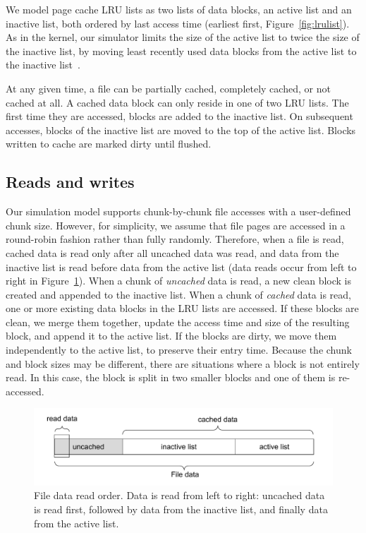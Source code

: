 We model page cache LRU lists as
two lists of data blocks, an active list and an inactive list, both ordered by
last access time (earliest first, Figure~\ref{fig:lrulist}).
As in the kernel, our simulator limits the size of the active list to
twice the size of the inactive list, by moving least recently
used data blocks from the active list to the inactive list~\cite{gorman2004understanding, linuxdev3rd2010}.

At any given time, a file can be partially cached, completely cached,
or not cached at all. A cached data block can only reside in one of two
LRU lists. The first time they are accessed, blocks are
added to the inactive list. On subsequent accesses, blocks of the
inactive list are moved to the top of the active list. Blocks
written to cache are marked dirty until flushed.

\subsection{Reads and writes}

Our simulation model supports chunk-by-chunk file accesses
with a user-defined chunk size. However, for simplicity, we assume that file pages are
accessed in a round-robin fashion rather than fully randomly.
Therefore, when a file is read, cached data is read only after all uncached data was read, and data from the inactive list is read
before data from the active list
(data reads occur from left to right in Figure~\ref{fig:read_order}).
When a chunk of \emph{uncached} data is read, a new clean block is created
and appended to the inactive list.
When a chunk of \emph{cached} data is read, one or more existing data blocks in the LRU lists are accessed.
If these blocks are clean, we merge them together, update the access time and size of the resulting block,
and append it to the active list.
If the blocks are dirty, we move them independently to the active list, to preserve their entry time.
Because the chunk and block sizes may be different, there are situations
where a block is not entirely read.
In this case, the block is split in two smaller blocks and one of them is re-accessed.
\begin{figure}
       \centering
       \includegraphics[width=\columnwidth]{figures/read_order.pdf}
       \caption{File data read order. Data is read from left to right: uncached data
       is read first, followed by data from the inactive list, and finally data from the active list. }
       \label{fig:read_order}
\end{figure}

